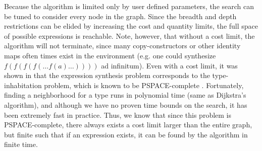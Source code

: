 Because the algorithm is limited only by user defined parameters, the
search can be tuned to consider every node in the graph. Since the
breadth and depth restrictions can be elided by increasing the cost
and quantity limits, the full space of possible expressions is
reachable. Note, however, that without a cost limit, the algorithm
will not terminate, since many copy-constructors or other identity
maps often times exist in the environment (e.g. one could synthesize
$f(f(f(f(\ldots f(a)\ldots ))))$ ad infinitum). Even with a cost
limit, it was shown in
\cite{GveroETAL13CompleteCompletionTypesWeights} that the expression
synthesis problem corresponds to the type-inhabitation problem, which
is known to be PSPACE-complete \cite{Urzyczyn97}. Fortunately, finding
a neighborhood for a type runs in polynomial time (same as Dijkstra's
algorithm), and although we have no proven time bounds on the search,
it has been extremely fast in practice. Thus, we know that since this
problem is PSPACE-complete, there always exists a cost limit larger
than the entire graph, but finite such that if an expression exists,
it can be found by the algorithm in finite time.

\fi
